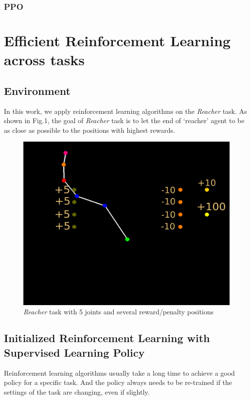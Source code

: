 \documentclass{article}
\begin{document}
\subsubsection{PPO}






\section{Efficient Reinforcement Learning across tasks}
\subsection{Environment}
In this work, we apply reinforcement learning algorithms on the \textit{Reacher} task. As shown in Fig.1, the goal of \textit{Reacher} task is to let the end of `reacher'  agent to be as close as possible to the positions with highest rewards.
\begin{figure}[htbp]
	\centering
	\includegraphics[scale=0.2]{img/reacher.png}
	\caption{\textit{Reacher} task with 5 joints and several reward/penalty positions}
	\label{fig:universe}
\end{figure}

\subsection{Initialized Reinforcement Learning with Supervised Learning Policy}
Reinforcement learning algorithms usually take a long time to achieve a good policy for a specific task. And the policy always needs to be re-trained if the settings of the task are changing, even if slightly. 
\end{document}
